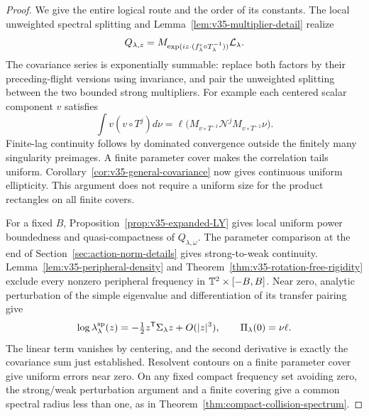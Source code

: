 \begin{proof}
We give the entire logical route and the order of its constants.
The local unweighted spectral splitting and
Lemma~\ref{lem:v35-multiplier-detail} realize
\[
 Q_{\lambda,z}=M_{\exp(i z\cdot(f^{\rm c}_\lambda\circ T_\lambda^{-1}))}
                                      \mathcal L_\lambda.
\]
The covariance series is exponentially summable: replace both factors
by their preceding-flight versions using invariance, and pair the
unweighted splitting between the two bounded strong multipliers.
For example each centered scalar component $v$ satisfies
\[
 \int v(v\circ T^j)d\nu
 =\ell\bigl(M_{v\circ T^{-1}}\mathcal N^j
                         M_{v\circ T^{-1}}\nu\bigr).
\]
Finite-lag continuity follows by dominated convergence outside the
finitely many singularity preimages. A finite parameter cover makes
the correlation tails uniform. Corollary~\ref{cor:v35-general-covariance}
now gives continuous uniform ellipticity. This argument does not
require a uniform size for the product rectangles on all finite covers.

For a fixed $B$, Proposition~\ref{prop:v35-expanded-LY} gives local
uniform power boundedness and quasi-compactness of $Q_{\lambda,\omega}$.
The parameter comparison at the end of
Section~\ref{sec:action-norm-details} gives strong-to-weak continuity.
Lemma~\ref{lem:v35-peripheral-density} and
Theorem~\ref{thm:v35-rotation-free-rigidity} exclude every nonzero
peripheral frequency in $\mathbb T^2\times[-B,B]$. Near zero, analytic
perturbation of the simple eigenvalue and differentiation of its
transfer pairing give
\begin{equation}\label{eq:v35-family-eigenvalue}
 \log\lambda^{\rm sp}_\lambda(z)
       =-\tfrac12z^{\mathsf T}\Sigma_\lambda z+O(|z|^3),
                  \qquad \Pi_\lambda(0)=\nu\ell.
\end{equation}
The linear term vanishes by centering, and the second derivative is
exactly the covariance sum just established. Resolvent contours on
a finite parameter cover give uniform errors near zero. On any fixed
compact frequency set avoiding zero, the strong/weak perturbation
argument and a finite covering give a common spectral radius less
than one, as in Theorem~\ref{thm:compact-collision-spectrum}.


\end{proof}

